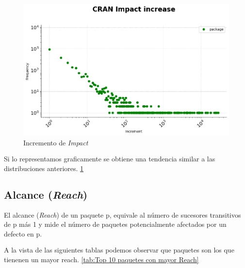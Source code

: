 \begin{figure}[h!]
    \begin{center}
        \includegraphics[width=1\textwidth]{img/cran/impact_increase_dist.png}
        \caption{Incremento de \textit{Impact}}
        \label{fig:Incremento de Impact}
    \end{center}
\end{figure}

Si lo representamos graficamente se obtiene una tendencia similar a las distribuciones anteriores. \ref{fig:Incremento de Impact}

\subsection{Alcance (\textit{Reach})}

El alcance (\textit{Reach}) de un paquete p, equivale al número de sucesores transitivos
de p más 1 y mide el número de paquetes potencialmente afectados
por un defecto en p.

A la vista de las siguientes tablas podemos observar que  paquetes
son los que tienenen un mayor reach. \ref{tab:Top 10 paquetes con mayor Reach}

